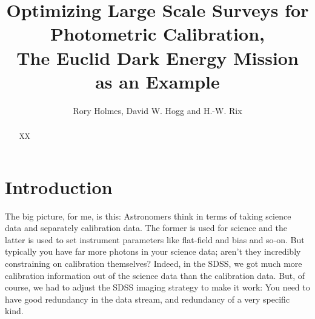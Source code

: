 \documentclass[manuscript]{aastex}
\begin{document}

\title{Optimizing Large Scale Surveys for Photometric Calibration, \\
    The Euclid Dark Energy Mission as an Example}


\author{Rory Holmes, David W. Hogg and H.-W. Rix}




\begin{abstract}
XX
\end{abstract}



\section{Introduction}
The big picture, for me, is this: Astronomers think in terms of taking science data and separately calibration data. The former is used for science and the latter is used to set instrument parameters like flat-field and bias and so-on. But typically you have far more photons in your science data; aren't they incredibly constraining on calibration themselves? Indeed, in the SDSS, we got much more calibration information out of the science data than the calibration data. But, of course, we had to adjust the SDSS imaging strategy to make it work: You need to have good redundancy in the data stream, and redundancy of a very specific kind.
\end{document}
